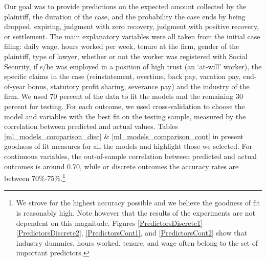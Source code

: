 \documentclass[11pt, a4paper]{article}
\begin{document}
Our goal was to provide predictions on the expected amount collected by the plaintiff, the duration of the case, and the probability the case ends by being dropped, expiring, judgment with zero recovery, judgment with positive recovery, or settlement. The main explanatory variables were all taken from the initial case filing: daily wage, hours worked per week, tenure at the firm, gender of the plaintiff, type of lawyer, whether or not the worker was registered with Social Security, if s/he was employed in a position of high trust (an `at-will' worker), the specific claims in the case (reinstatement, overtime, back pay, vacation pay, end-of-year bonus, statutory profit sharing, severance pay) and the industry of the firm. We used 70 percent of the data to fit the models and the remaining 30 percent for testing. For each outcome, we used cross-validation to choose the model and variables with the best fit on the testing sample, measured by the correlation between predicted and actual values. Tables \ref{ml_models_comparison_disc} \&  \ref{ml_models_comparison_cont} in  present goodness of fit measures for all the models and highlight those we selected. For continuous variables, the out-of-sample correlation between predicted and actual outcomes is around 0.70, while or discrete outcomes the accuracy rates are between 70\%-75\%.\footnote{We strove for the highest accuracy possible and we believe the goodness of fit is reasonably high. Note however that the results of the experiments are not dependent on this magnitude. Figures \ref{PredictorsDiscrete1} \ref{PredictorsDiscrete2}, \ref{PredictorsCont1}, and \ref{PredictorsCont2} show that industry dummies, hours worked, tenure, and wage often belong to the set of important predictors.}
\end{document}
